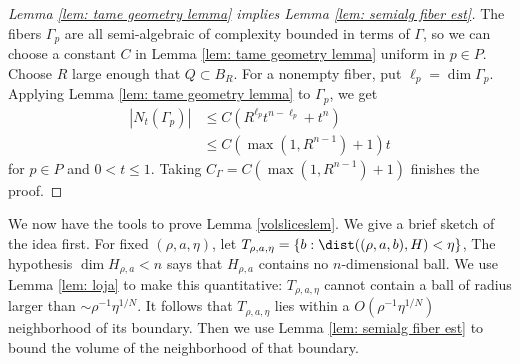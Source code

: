 \documentclass{article}
\numberwithin{equation}{section}
\theoremstyle{plain}
\begin{document}
\begin{proof}[Lemma \ref{lem: tame geometry lemma} implies Lemma \ref{lem: semialg fiber est}]
    The fibers $\Gamma_p$ are all semi-algebraic of complexity bounded in terms of $\Gamma$, so we can choose a constant $C$ in Lemma \ref{lem: tame geometry lemma} uniform in $p \in P$. 
    Choose $R$ large enough that $Q \subset B_R$. For a nonempty fiber, put $\ell_p = \dim \Gamma_p$. Applying Lemma \ref{lem: tame geometry lemma} to $\Gamma_p$, we get 
    \begin{align}
        |N_t(\Gamma_p)| &\leq C(R^{\ell_p}t^{n-\ell_p} + t^n) \\
        &\leq C(\max(1,R^{n-1}) + 1)t
    \end{align}
    for $p \in P$ and $0 < t \leq 1$. Taking $C_{\Gamma} = C(\max(1,R^{n-1}) + 1)$ finishes the proof. 
\end{proof}

We now have the tools to prove Lemma \ref{volsliceslem}. We give a brief sketch of the idea first. For fixed $(\rho,a,\eta)$, let $T_{\rho,a,\eta} = \{b : \dist((\rho,a,b),H) < \eta\}$, The hypothesis $\dim H_{\rho,a} < n$ says that $H_{\rho,a}$ contains no $n$-dimensional ball. We use Lemma \ref{lem: loja} to make this quantitative: $T_{\rho,a,\eta}$ cannot contain a ball of radius larger than $\sim\rho^{-1} \eta^{1/N}$. It follows that $T_{\rho,a,\eta}$ lies within a $O(\rho^{-1} \eta^{1/N})$ neighborhood of its boundary. Then we use Lemma \ref{lem: semialg fiber est} to bound the volume of the neighborhood of that boundary. 
\end{document}
